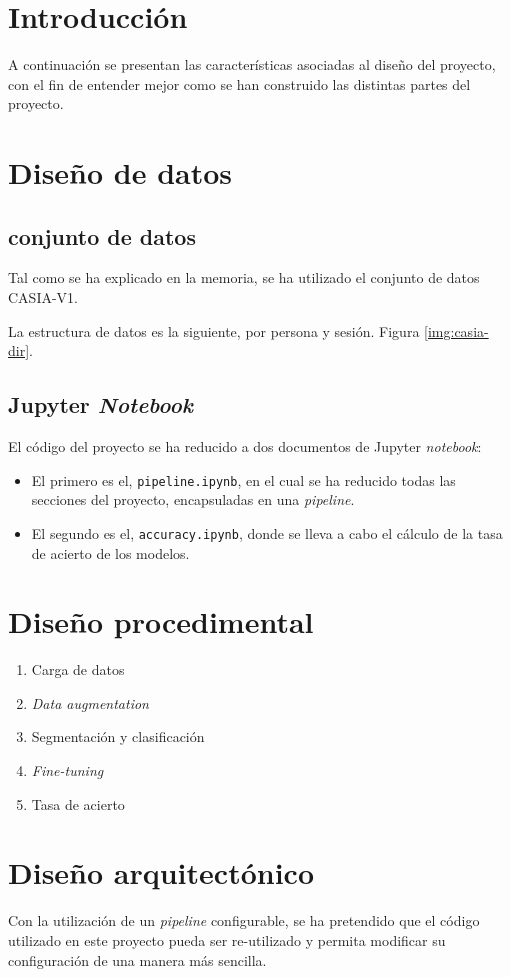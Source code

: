 
\section{Introducción}

A continuación se presentan las características asociadas al diseño del proyecto, con el fin de entender mejor como se han construido las distintas partes del proyecto.

\section{Diseño de datos}

\subsection{conjunto de datos} \label{anx:dataset}

Tal como se ha explicado en la memoria, se ha utilizado el conjunto de datos CASIA-V1.

La estructura de datos es la siguiente, por persona y sesión. Figura \ref{img:casia-dir}.


\subsection{Jupyter \textit{Notebook}}

El código del proyecto se ha reducido a dos documentos de Jupyter \textit{notebook}:


\begin{itemize}
    \item El primero es el, \texttt{pipeline.ipynb}, en el cual se ha reducido todas las secciones del proyecto, encapsuladas en una \textit{pipeline}.
    \item El segundo es el, \texttt{accuracy.ipynb}, donde se lleva a cabo el cálculo de la tasa de acierto de los modelos.
\end{itemize}


\section{Diseño procedimental}

\begin{enumerate}
    \item Carga de datos
    \item \textit{Data augmentation}
    \item Segmentación y clasificación
    \item \textit{Fine-tuning}
    \item Tasa de acierto
    \end{enumerate}

\section{Diseño arquitectónico}

Con la utilización de un \textit{pipeline} configurable, se ha pretendido que el código utilizado en este proyecto pueda ser re-utilizado y permita modificar su configuración de una manera más sencilla.
